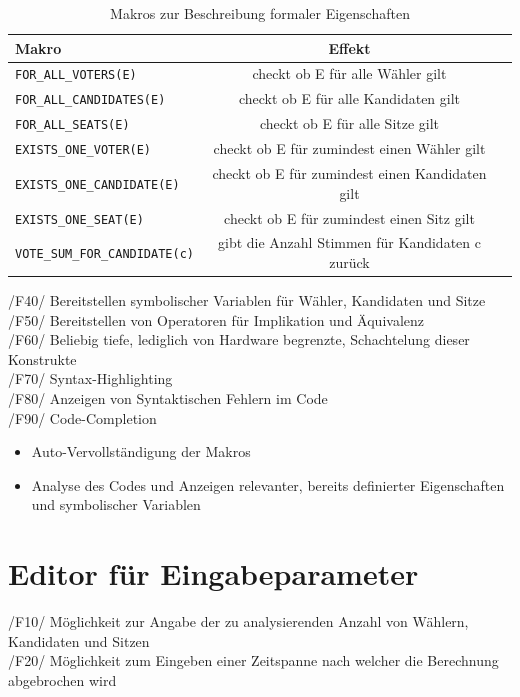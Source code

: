 \documentclass[a4paper]{scrreprt}
\begin{document}
\begin{table}
\caption{Makros zur Beschreibung formaler Eigenschaften}
\begin{tabular}{lcr} 
Makro & Effekt \\
\hline 
\verb!FOR_ALL_VOTERS(E)! & checkt ob E für alle Wähler gilt \\
\verb!FOR_ALL_CANDIDATES(E)! & checkt ob E für alle Kandidaten gilt \\
\verb!FOR_ALL_SEATS(E)! & checkt ob E für alle Sitze gilt \\
\verb!EXISTS_ONE_VOTER(E)! & checkt ob E für zumindest einen Wähler gilt \\
\verb!EXISTS_ONE_CANDIDATE(E)! & checkt ob E für zumindest einen Kandidaten gilt \\
\verb!EXISTS_ONE_SEAT(E)! & checkt ob E für zumindest einen Sitz gilt \\
\verb!VOTE_SUM_FOR_CANDIDATE(c)! & gibt die Anzahl Stimmen für Kandidaten c zurück\\
\end{tabular}
\label{table:Macros_for_formal_Attributes}
\end{table}
/F40/ Bereitstellen symbolischer Variablen für Wähler, Kandidaten und Sitze \\
/F50/ Bereitstellen von Operatoren für Implikation und Äquivalenz \\
/F60/ Beliebig tiefe, lediglich von Hardware begrenzte, Schachtelung dieser Konstrukte \\
/F70/ Syntax-Highlighting \\
/F80/ Anzeigen von Syntaktischen Fehlern im Code \\
/F90/ Code-Completion
\begin{itemize}
\item Auto-Vervollständigung der Makros
\item Analyse des Codes und Anzeigen relevanter, bereits definierter Eigenschaften und symbolischer Variablen
\end{itemize}

\section{Editor für Eingabeparameter}
/F10/ Möglichkeit zur Angabe der zu analysierenden Anzahl von Wählern, Kandidaten und Sitzen \\
/F20/ Möglichkeit zum Eingeben einer Zeitspanne nach welcher die Berechnung abgebrochen wird \\
\end{document}
